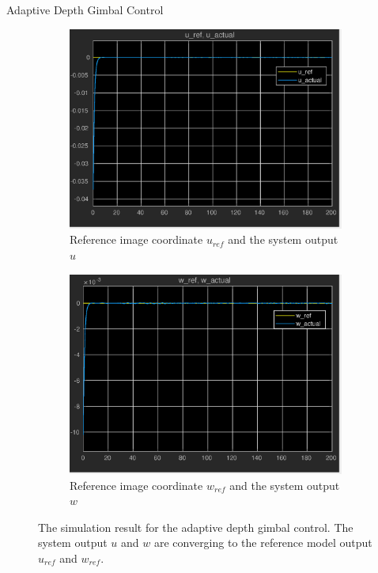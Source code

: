 \documentclass[9pt]{beamer}
\newenvironment{figure*}%
{\begin{figure}}
{\end{figure}}
\begin{document}
\begin{frame}{Adaptive Depth Gimbal Control}
	\begin{figure}[htbp]
		\centering
		\begin{subfigure}{0.5\textwidth}
			\centering
			\includegraphics[width=0.8\linewidth]{chapter2/u_adaptive}
			\caption{Reference image coordinate $u_{ref}$ and the system output $u$}
		\end{subfigure}%
		\begin{subfigure}{0.5\textwidth}
			\centering
			\includegraphics[width=0.8\linewidth]{chapter2/w_adaptive}
			\caption{Reference image coordinate $w_{ref}$ and the system output $w$}
		\end{subfigure}
		\caption{The simulation result for the adaptive depth gimbal control. The system output $u$ and $w$ are converging to the reference model output $u_{ref}$ and $w_{ref}$.}
		\label{adaptive_result}
	\end{figure}
\end{frame}
\end{document}
